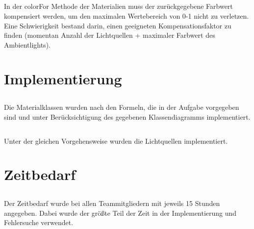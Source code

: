 \documentclass[11pt]{amsart}
\begin{document}
\subsection{}
In der colorFor Methode der Materialien muss der zur\"uckgegebene Farbwert
kompensiert werden, um den maximalen Wertebereich von 0-1 nicht zu verletzen.
Eine Schwierigkeit bestand darin, einen geeigneten Kompensationsfaktor zu finden
(momentan Anzahl der Lichtquellen + maximaler Farbwert des Ambientlights).

\section{Implementierung}
\subsection{}
Die Materialklassen wurden nach den Formeln, die in der Aufgabe vorgegeben 
sind und unter Ber\"ucksichtigung des gegebenen Klassendiagramms implementiert.

\subsection{}
Unter der gleichen Vorgehensweise wurden die Lichtquellen implementiert.


\section{Zeitbedarf}
\subsection{}
Der Zeitbedarf wurde bei allen Teammitgliedern mit jeweils 15 Stunden angegeben. Dabei 
wurde der gr\"o{\ss}te Teil der Zeit in der Implementierung und Fehlersuche verwendet.
\end{document}
